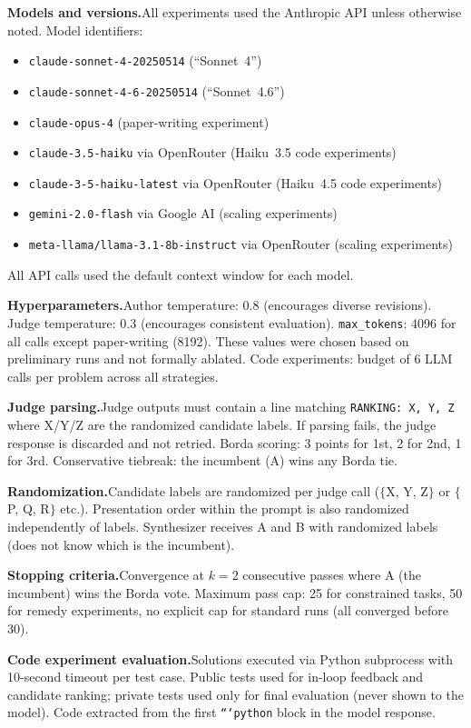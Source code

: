 \documentclass[11pt]{article}
\begin{document}
\textbf{Models and versions.}\enspace All experiments used the Anthropic API unless otherwise noted. Model identifiers:
\begin{itemize}
\item \texttt{claude-sonnet-4-20250514} (``Sonnet~4'')
\item \texttt{claude-sonnet-4-6-20250514} (``Sonnet~4.6'')
\item \texttt{claude-opus-4} (paper-writing experiment)
\item \texttt{claude-3.5-haiku} via OpenRouter (Haiku~3.5 code experiments)
\item \texttt{claude-3-5-haiku-latest} via OpenRouter (Haiku~4.5 code experiments)
\item \texttt{gemini-2.0-flash} via Google AI (scaling experiments)
\item \texttt{meta-llama/llama-3.1-8b-instruct} via OpenRouter (scaling experiments)
\end{itemize}
All API calls used the default context window for each model.

\textbf{Hyperparameters.}\enspace Author temperature: 0.8 (encourages diverse revisions). Judge temperature: 0.3 (encourages consistent evaluation). \texttt{max\_tokens}: 4096 for all calls except paper-writing (8192). These values were chosen based on preliminary runs and not formally ablated. Code experiments: budget of 6 LLM calls per problem across all strategies.

\textbf{Judge parsing.}\enspace Judge outputs must contain a line matching \texttt{RANKING: X, Y, Z} where X/Y/Z are the randomized candidate labels. If parsing fails, the judge response is discarded and not retried. Borda scoring: 3 points for 1st, 2 for 2nd, 1 for 3rd. Conservative tiebreak: the incumbent (A) wins any Borda tie.

\textbf{Randomization.}\enspace Candidate labels are randomized per judge call ($\{$X, Y, Z$\}$ or $\{$P, Q, R$\}$ etc.). Presentation order within the prompt is also randomized independently of labels. Synthesizer receives A and B with randomized labels (does not know which is the incumbent).

\textbf{Stopping criteria.}\enspace Convergence at $k{=}2$ consecutive passes where A (the incumbent) wins the Borda vote. Maximum pass cap: 25 for constrained tasks, 50 for remedy experiments, no explicit cap for standard runs (all converged before 30).

\textbf{Code experiment evaluation.}\enspace Solutions executed via Python subprocess with 10-second timeout per test case. Public tests used for in-loop feedback and candidate ranking; private tests used only for final evaluation (never shown to the model). Code extracted from the first \texttt{```python} block in the model response.
\end{document}
